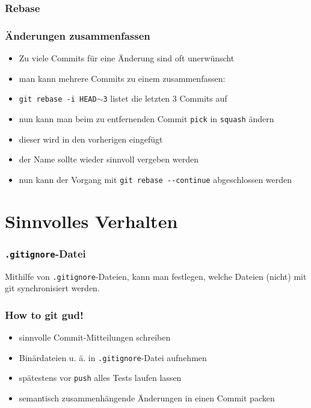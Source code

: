 \documentclass[accentcolor=tud8b,colorbacktitle,inverttitle,landscape,german,presentation,t]{tudbeamer}
\begin{document}
		\subsubsection{Rebase}
			\begin{frame}
				\frametitle{Änderungen zusammenfassen}
					\begin{itemize}
						\item Zu viele Commits für eine Änderung sind oft unerwünscht
						\item man kann mehrere Commits zu einem zusammenfassen:
						\item \texttt{git rebase -i HEAD$\sim$3} listet die letzten 3 Commits auf
						\item nun kann man beim zu entfernenden Commit \texttt{pick} in \texttt{squash} ändern
						\item dieser wird in den vorherigen eingefügt
						\item der Name sollte wieder sinnvoll vergeben werden
						\item nun kann der Vorgang mit \texttt{git rebase -{-}continue} abgeschlossen werden 
					\end{itemize}
			\end{frame}

\section{Sinnvolles Verhalten}

			\begin{frame}
				\frametitle{\texttt{.gitignore}-Datei}
				Mithilfe von \texttt{.gitignore}-Dateien, kann man festlegen, welche Dateien (nicht) mit git synchronisiert werden.
				
			\end{frame}
			
			\begin{frame}
				\frametitle{How to git gud!}
					\begin{itemize}
						\item sinnvolle Commit-Mitteilungen schreiben
						\item Binärdateien u. ä. in \texttt{.gitignore}-Datei aufnehmen
						\item spätestens vor \texttt{push} alles Tests laufen lassen
						\item semantisch zusammenhängende Änderungen in einen Commit packen
					\end{itemize}
			\end{frame}
			
\end{document}
